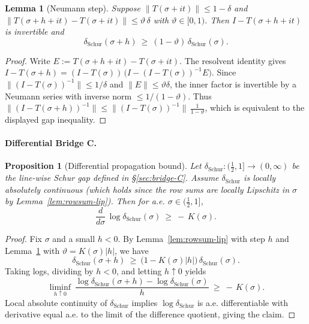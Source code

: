 \documentclass[11pt]{article}
\newtheorem{proposition}[theorem]{Proposition}
\newtheorem{lemma}[theorem]{Lemma}
\theoremstyle{definition}
\theoremstyle{remark}
\begin{document}
\begin{lemma}[Neumann step]\label{lem:neumann-step}
Suppose $\|T(\sigma+it)\|\le 1-\delta$ and $\|T(\sigma+h+it)-T(\sigma+it)\|\le \vartheta\,\delta$ with $\vartheta\in[0,1)$. Then $I-T(\sigma+h+it)$ is invertible and
\[
  \delta_{\mathrm{Schur}}(\sigma+h)\ \ge\ (1-\vartheta)\,\delta_{\mathrm{Schur}}(\sigma).
\]
\end{lemma}
\begin{proof}
Write $E:=T(\sigma+h+it)-T(\sigma+it)$. The resolvent identity gives $I-T(\sigma+h)= (I-T(\sigma))\,\big(I-(I-T(\sigma))^{-1}E\big)$. Since $\|(I-T(\sigma))^{-1}\|\le 1/\delta$ and $\|E\|\le \vartheta\delta$, the inner factor is invertible by a Neumann series with inverse norm $\le 1/(1-\vartheta)$. Thus $\|(I-T(\sigma+h))^{-1}\|\le \|(I-T(\sigma))^{-1}\|\,\frac{1}{1-\vartheta}$, which is equivalent to the displayed gap inequality.
\end{proof}

\paragraph{Differential Bridge C.}
\begin{proposition}[Differential propagation bound]\label{prop:diff-bridgeC}
Let $\delta_{\mathrm{Schur}}:(\tfrac12,1]\to(0,\infty)$ be the line-wise Schur gap defined in \S\ref{sec:bridge-C}. Assume $\delta_{\mathrm{Schur}}$ is locally absolutely continuous (which holds since the row sums are locally Lipschitz in $\sigma$ by Lemma~\ref{lem:rowsum-lip}). Then for a.e. $\sigma\in(\tfrac12,1]$,
\[
  \frac{d}{d\sigma}\,\log \delta_{\mathrm{Schur}}(\sigma)\ \ge\ -\,K(\sigma).
\]
\end{proposition}

\begin{proof}
Fix $\sigma$ and a small $h<0$. By Lemma~\ref{lem:rowsum-lip} with step $h$ and Lemma~\ref{lem:neumann-step} with $\vartheta=K(\sigma)|h|$, we have
\[
  \delta_{\mathrm{Schur}}(\sigma+h)\ \ge\ \big(1-K(\sigma)|h|\big)\,\delta_{\mathrm{Schur}}(\sigma).
\]
Taking logs, dividing by $h<0$, and letting $h\uparrow 0$ yields
\[
  \liminf_{h\uparrow 0}\ \frac{\log\delta_{\mathrm{Schur}}(\sigma+h)-\log\delta_{\mathrm{Schur}}(\sigma)}{h}\ \ge\ -\,K(\sigma).
\]
Local absolute continuity of $\delta_{\mathrm{Schur}}$ implies $\log\delta_{\mathrm{Schur}}$ is a.e. differentiable with derivative equal a.e. to the limit of the difference quotient, giving the claim.
\end{proof}
\end{document}
